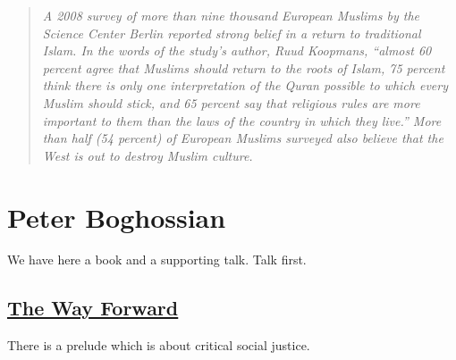 \documentclass[10pt,titlepage]{book}
\begin{document}
\begin{quote}
{\it
A 2008 survey of more than nine thousand European Muslims
by the Science Center Berlin reported strong belief in a return
to traditional Islam. In the words of the study’s author, Ruud
Koopmans, “almost 60 percent agree that Muslims should return
to the roots of Islam, 75 percent think there is only one interpretation of the Quran possible to which every Muslim should stick,
and 65 percent say that religious rules are more important to
them than the laws of the country in which they live.” More than
half (54 percent) of European Muslims surveyed also believe
that the West is out to destroy Muslim culture.
}
\end{quote}

\section{Peter Boghossian}\label{Boghossian}

We have here a book and a supporting talk.
Talk first.

\subsection{\href{https://www.youtube.com/watch?v=LiymUd9FjHA}{The Way Forward}}

There is a prelude which is about critical social justice.
\end{document}
